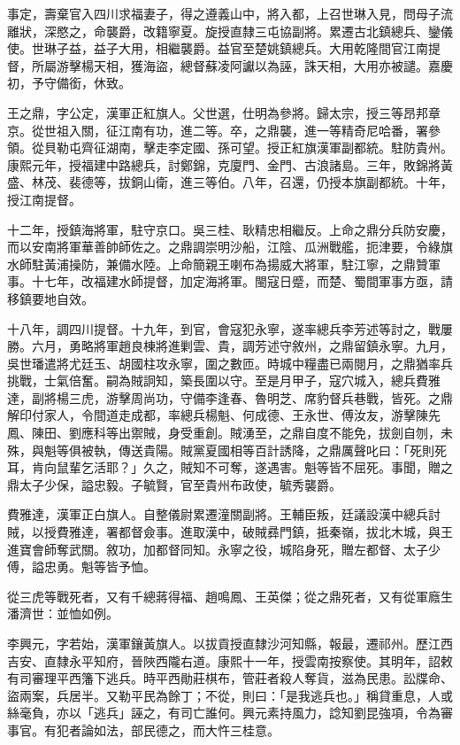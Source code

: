 \begin{pinyinscope}
事定，壽棄官入四川求福妻子，得之遵義山中，將入都，上召世琳入見，問母子流離狀，深愍之，命襲爵，改籍寧夏。旋授直隸三屯協副將。累遷古北鎮總兵、鑾儀使。世琳子益，益子大用，相繼襲爵。益官至楚姚鎮總兵。大用乾隆間官江南提督，所屬游擊楊天相，獲海盜，總督蘇凌阿讞以為誣，誅天相，大用亦被譴。嘉慶初，予守備銜，休致。

王之鼎，字公定，漢軍正紅旗人。父世選，仕明為參將。歸太宗，授三等昂邦章京。從世祖入關，征江南有功，進二等。卒，之鼎襲，進一等精奇尼哈番，署參領。從貝勒屯齊征湖南，擊走李定國、孫可望。授正紅旗漢軍副都統。駐防貴州。康熙元年，授福建中路總兵，討鄭錦，克廈門、金門、古浪諸島。三年，敗錦將黃盛、林茂、裴德等，拔銅山衛，進三等伯。八年，召還，仍授本旗副都統。十年，授江南提督。

十二年，授鎮海將軍，駐守京口。吳三桂、耿精忠相繼反。上命之鼎分兵防安慶，而以安南將軍華善帥師佐之。之鼎調崇明沙船，江陰、瓜洲戰艦，扼津要，令綠旗水師駐黃浦操防，兼備水陸。上命簡親王喇布為揚威大將軍，駐江寧，之鼎贊軍事。十七年，改福建水師提督，加定海將軍。閩寇日蹙，而楚、蜀間軍事方亟，請移鎮要地自效。

十八年，調四川提督。十九年，到官，會寇犯永寧，遂率總兵李芳述等討之，戰屢勝。六月，勇略將軍趙良棟將進剿雲、貴，調芳述守敘州，之鼎留鎮永寧。九月，吳世璠遣將尤廷玉、胡國柱攻永寧，圍之數匝。時城中糧盡已兩閱月，之鼎猶率兵挑戰，士氣倍奮。嗣為賊詗知，築長圍以守。至是月甲子，寇穴城入，總兵費雅達，副將楊三虎，游擊周尚功，守備李逢春、魯明芝、席豹督兵巷戰，皆死。之鼎解印付家人，令間道走成都，率總兵楊魁、何成德、王永世、傅汝友，游擊陳先鳳、陳田、劉應科等出禦賊，身受重創。賊湧至，之鼎自度不能免，拔劍自刎，未殊，與魁等俱被執，傳送貴陽。賊黨夏國相等百計誘降，之鼎厲聲叱曰：「死則死耳，肯向鼠輩乞活耶？」久之，賊知不可奪，遂遇害。魁等皆不屈死。事聞，贈之鼎太子少保，謚忠毅。子毓賢，官至貴州布政使，毓秀襲爵。

費雅達，漢軍正白旗人。自整儀尉累遷潼關副將。王輔臣叛，廷議設漢中總兵討賊，以授費雅達，署都督僉事。進取漢中，破賊彞門鎮，抵秦嶺，拔北木城，與王進寶會師奪武關。敘功，加都督同知。永寧之役，城陷身死，贈左都督、太子少傅，謚忠勇。魁等皆予恤。

從三虎等戰死者，又有千總蔣得福、趙鳴鳳、王英傑；從之鼎死者，又有從軍廕生潘濟世：並恤如例。

李興元，字若始，漢軍鑲黃旗人。以拔貢授直隸沙河知縣，報最，遷祁州。歷江西吉安、直隸永平知府，晉陜西隴右道。康熙十一年，授雲南按察使。其明年，詔敕有司審理平西籓下逃兵。時平西勛莊棋布，管莊者殺人奪貨，滋為民患。訟牒命、盜兩案，兵居半。又勒平民為餘丁；不從，則曰：「是我逃兵也。」稱貸重息，人或絲毫負，亦以「逃兵」誣之，有司亡誰何。興元素持風力，諗知劉昆強項，令為審事官。有犯者論如法，部民德之，而大忤三桂意。


\end{pinyinscope}
